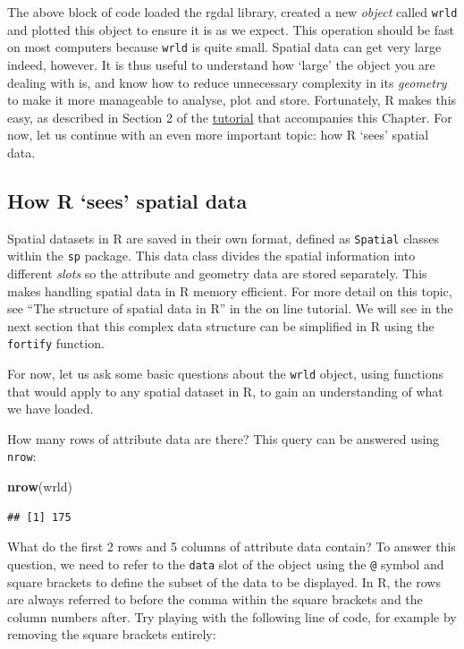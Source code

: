 \documentclass[]{article}
\newenvironment{Shaded}{}{}
\newcommand{\KeywordTok}[1]{\textcolor[rgb]{0.00,0.44,0.13}{\textbf{{#1}}}}
\newcommand{\NormalTok}[1]{{#1}}
\begin{document}
The above block of code loaded the rgdal library, created a new
\emph{object} called \texttt{wrld} and plotted this object to ensure it
is as we expect. This operation should be fast on most computers because
\texttt{wrld} is quite small. Spatial data can get very large indeed,
however. It is thus useful to understand how `large' the object you are
dealing with is, and know how to reduce unnecessary complexity in its
\emph{geometry} to make it more manageable to analyse, plot and store.
Fortunately, R makes this easy, as described in Section 2 of the
\href{https://github.com/geocomPP/sdvwR/blob/master/sdv-tutorial.pdf?raw=true}{tutorial}
that accompanies this Chapter. For now, let us continue with an even
more important topic: how R `sees' spatial data.

\subsection{How R `sees' spatial data}

Spatial datasets in R are saved in their own format, defined as
\texttt{Spatial} classes within the \texttt{sp} package. This data class
divides the spatial information into different \emph{slots} so the
attribute and geometry data are stored separately. This makes handling
spatial data in R memory efficient. For more detail on this topic, see
``The structure of spatial data in R'' in the on line tutorial. We will
see in the next section that this complex data structure can be
simplified in R using the \texttt{fortify} function.

For now, let us ask some basic questions about the \texttt{wrld} object,
using functions that would apply to any spatial dataset in R, to gain an
understanding of what we have loaded.

How many rows of attribute data are there? This query can be answered
using \texttt{nrow}:

\begin{Shaded}
\begin{Highlighting}[]
\KeywordTok{nrow}\NormalTok{(wrld)}
\end{Highlighting}
\end{Shaded}

\begin{verbatim}
## [1] 175
\end{verbatim}

What do the first 2 rows and 5 columns of attribute data contain? To
answer this question, we need to refer to the \texttt{data} slot of the
object using the \texttt{@} symbol and square brackets to define the
subset of the data to be displayed. In R, the rows are always referred
to before the comma within the square brackets and the column numbers
after. Try playing with the following line of code, for example by
removing the square brackets entirely:
\end{document}
